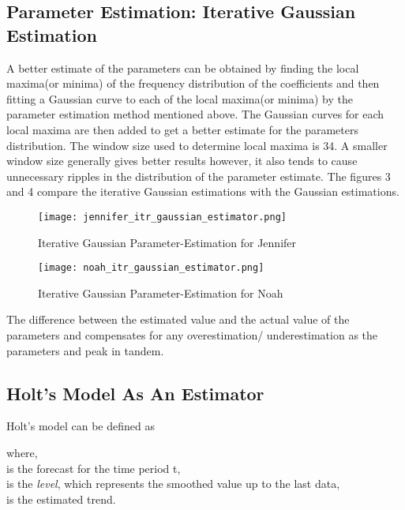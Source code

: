 \documentclass[letterpaper,12pt]{article}
\begin{document}
\subsection{Parameter Estimation: Iterative Gaussian Estimation}
A better estimate of the parameters can be obtained by finding the local maxima(or minima) of the frequency distribution of the coefficients and then fitting a Gaussian curve to each of the local maxima(or minima) by the parameter estimation method mentioned above. The Gaussian curves for each local maxima are then added to get a better estimate for the parameters distribution.
The window size used to determine local maxima is 34. A smaller window size generally gives better results however, it also tends to cause unnecessary ripples in the distribution of the parameter estimate.
The figures 3 and 4 compare the iterative Gaussian estimations with the Gaussian estimations.\\
\begin{figure}[!htb]
\texttt{[image: jennifer\_itr\_gaussian\_estimator.png]}
\caption{Iterative Gaussian Parameter-Estimation for Jennifer}
\end{figure}
\begin{figure}[!htb]
\texttt{[image: noah\_itr\_gaussian\_estimator.png]}
\caption{Iterative Gaussian Parameter-Estimation for Noah}
\end{figure}

The difference between the estimated value and the actual value of the parameters  and  compensates for any overestimation/ underestimation as the parameters  and  peak in tandem.
\pagebreak

\subsection{Holt's Model As An Estimator}
Holt's model can be defined as

  where, \\
 is the forecast for the time period t, \\
 is the \textit{level}, which represents the smoothed value up to the last data, \\
 is the estimated trend.
\end{document}

